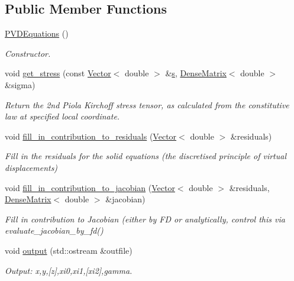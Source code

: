 \subsection*{Public Member Functions}
\begin{DoxyCompactItemize}
\item 
\hyperlink{classoomph_1_1PVDEquations_a887fd03c27e4d7847b5eddeb66b0366d}{P\+V\+D\+Equations} ()
\begin{DoxyCompactList}\small\item\em Constructor. \end{DoxyCompactList}\item 
void \hyperlink{classoomph_1_1PVDEquations_add6a194b0138b09834022b29bbc75eb6}{get\+\_\+stress} (const \hyperlink{classoomph_1_1Vector}{Vector}$<$ double $>$ \&\hyperlink{cfortran_8h_ab7123126e4885ef647dd9c6e3807a21c}{s}, \hyperlink{classoomph_1_1DenseMatrix}{Dense\+Matrix}$<$ double $>$ \&sigma)
\begin{DoxyCompactList}\small\item\em Return the 2nd Piola Kirchoff stress tensor, as calculated from the constitutive law at specified local coordinate. \end{DoxyCompactList}\item 
void \hyperlink{classoomph_1_1PVDEquations_ad21ebcee8cb3539af51304acad82f79c}{fill\+\_\+in\+\_\+contribution\+\_\+to\+\_\+residuals} (\hyperlink{classoomph_1_1Vector}{Vector}$<$ double $>$ \&residuals)
\begin{DoxyCompactList}\small\item\em Fill in the residuals for the solid equations (the discretised principle of virtual displacements) \end{DoxyCompactList}\item 
void \hyperlink{classoomph_1_1PVDEquations_a7a84eddfcf9bd10eec76fd4baa739806}{fill\+\_\+in\+\_\+contribution\+\_\+to\+\_\+jacobian} (\hyperlink{classoomph_1_1Vector}{Vector}$<$ double $>$ \&residuals, \hyperlink{classoomph_1_1DenseMatrix}{Dense\+Matrix}$<$ double $>$ \&jacobian)
\begin{DoxyCompactList}\small\item\em Fill in contribution to Jacobian (either by FD or analytically, control this via evaluate\+\_\+jacobian\+\_\+by\+\_\+fd() \end{DoxyCompactList}\item 
void \hyperlink{classoomph_1_1PVDEquations_ab9e919921934cfe7433420bd2e4482f5}{output} (std\+::ostream \&outfile)
\begin{DoxyCompactList}\small\item\em Output\+: x,y,\mbox{[}z\mbox{]},xi0,xi1,\mbox{[}xi2\mbox{]},gamma. \end{DoxyCompactList}\item 

\end{DoxyCompactItemize}
